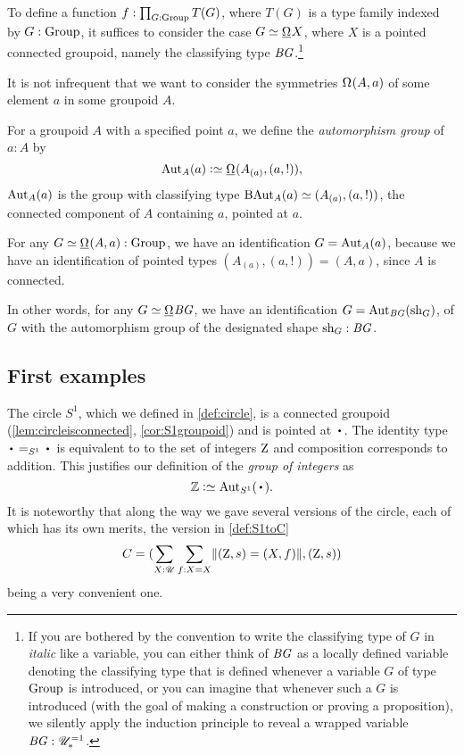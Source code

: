 \begin{remark}\label{rem:BG-convention}
  To define a function $f : \prod_{G:\mathrm{Group}}T(G)$,
  where $T(G)$ is a type family indexed by $G:\mathrm{Group}$,
  it suffices to consider the case $G\jdeq\mkgroup X$,
  where $X$ is a pointed connected groupoid,
  namely the classifying type $\mathit{B}\mathit{G}$.\footnote{%
    If you are bothered by the convention
    to write the classifying type of $G$ in \emph{italic} like a variable,
    you can either think of $\mathit{B}\mathit{G}$ as a locally defined
    variable denoting the classifying type that is
    defined whenever a variable $G$ of type $\mathrm{Group}$ is introduced,
    or you can imagine that whenever such a $G$ is introduced
    (with the goal of making a construction or proving a proposition),
    we silently apply the induction principle to
    reveal a wrapped variable $\mathit{B}\mathit{G}:{\mathscr{U}}_\ast^{=1}$.}
\end{remark}

It is not infrequent that we want to consider the symmetries $\loops(A,a)$
of some element $a$ in some groupoid $A$.
\begin{definition}\label{def:automorphism-group}
  For a groupoid $A$ with a specified point $a$,
  we define the \emph{automorphism group} of $a:A$ by
  \[
    \Aut_A(a) \defeq \mkgroup (A_{(a)},(a,!)),
  \]
  \ie $\Aut_A(a)$ is the group with classifying type
  $\BAut_A(a) \jdeq (A_{(a)},(a,!))$,
  the connected component of $A$ containing $a$, pointed at $a$.
\end{definition}
\begin{remark}
  \label{rem:symmetriesofnonconnectedgroupoids}
  For any $G \jdeq \mkgroup(A,a) : \Group$, we have an identification
  $G = \Aut_A(a)$,
  because we have an identification of pointed types $(A_{(a)},(a,!)) = (A,a)$,
  since $A$ is connected.

  In other words, for any $G \jdeq \mkgroup\BG$, we have
  an identification $G = \Aut_{\BG}(\sh_G)$, of $G$ with the automorphism
  group of the designated shape $\mathrm{sh}_G : \mathit{B}\mathit{G}$.
\end{remark}

\subsection{First examples}
\label{sec:firstgroupexamples}
   \begin{example}\label{excirclegroup}
   The circle $S^1$, which we defined in \cref{def:circle}, is a connected groupoid (\cref{lem:circleisconnected}, \cref{cor:S1groupoid}) and is pointed at $\base$. The identity type $\base=_{S^1}\base$ is equivalent to to the set of integers $\mathrm{Z}$ and composition corresponds to addition.  This justifies our definition of the \emph{group of integers} as 
$$\ZZ \defeq \aut_{S^1}(\base).$$
It is noteworthy that along the way we gave several versions of the circle, each of which has its own merits, the version in \cref{def:S1toC}
$$C=(\sum_{X:{\mathscr{U}}}\sum_{f:X=X}\lVert(\mathrm{Z},s)=(X,f)\rVert, (\mathrm{Z},s))$$
being a very convenient one.
 \end{example}

